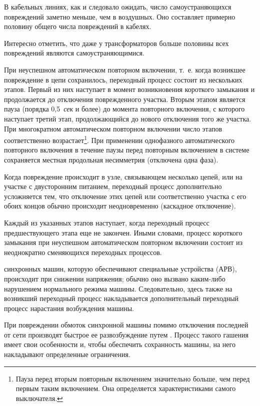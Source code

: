 В кабельных линиях, как и следовало ожидать, число самоустраняющихся повреждений заметно меньше, чем в воздушных. Оно составляет примерно половину общего числа повреждений в кабелях.

Интересно отметить, что даже у трансформаторов больше половины всех повреждений являются самоустраняющимися.

При неуспешном автоматическом повторном включении, т.~е. когда возникшее повреждение в цепи сохранилось, переходный процесс состоит из нескольких этапов. Первый из них наступает в момент возникновения короткого замыкания и продолжается до отключения поврежденного участка. Вторым этапом является пауза (порядка 0,5~\textit{сек} и более) до момента повторного включения, с которого наступает третий этап, продолжающийся до нового отключения того же участка. При многократном автоматическом повторном включении число этапов соответственно возрастает\footnote{Пауза перед вторым повторным включением значительно больше, чем перед первым таким включением. Она определяется характеристиками самого выключателя.}. При применении однофазного автоматического повторного включения в течение паузы перед повторным включением в системе сохраняется местная продольная несимметрия (отключена одна фаза).

Когда повреждение происходит в узле, связывающем несколько цепей, или на участке с двусторонним питанием, переходный процесс дополнительно усложняется тем, что отключение этих цепей или соответственно участка с его обоих концов обычно происходит неодновременно (каскадное отключение).

Каждый из указанных этапов наступает, когда переходный процесс предшествующего этапа еще не закончен. Иными словами, процесс короткого замыкания при неуспешном автоматическом повторном включении состоит из неоднократно сменяющихся переходных процессов.

 синхронных машин, которую обеспечивают специальные устройства  (АРВ), происходит при снижении напряжения; обычно оно вызвано каким-либо нарушением нормального режима машины. Следовательно, здесь также на возникший переходный процесс накладывается дополнительный переходный процесс нарастания возбуждения машины.

При повреждении обмоток синхронной машины помимо отключения последней от сети производят быстрое ее развозбуждение путем . Процесс такого гашения имеет свои особенности и, чтобы обеспечить сохранность машины, на него накладывают определенные ограничения.

